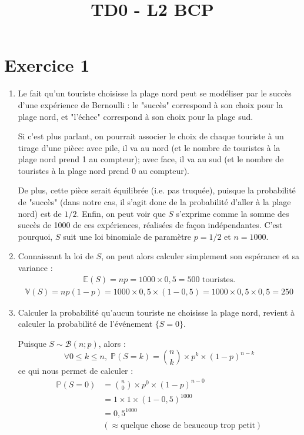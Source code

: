 \documentclass[a4paper,oneside,12pt]{article}
\title{TD0 - L2 BCP}
\author{}
\date{}
\theoremstyle{plain}
\def\V{\mathbb{V}}
\def\P{{\mathbb P}}
\def\E{{\mathbb E}}
\begin{document}
\maketitle

\section*{Exercice 1}



\begin{enumerate}
    \item Le fait qu'un touriste choisisse la plage nord peut se modéliser par le succès d'une expérience de Bernoulli : le "succès" correspond à son choix pour la plage nord, et "l'échec" correspond à son choix pour la plage sud.
    
    Si c'est plus parlant, on pourrait associer le choix de chaque touriste à un tirage d'une pièce: avec pile, il va au nord (et le nombre de touristes à la plage nord prend 1 au compteur); avec face, il va au sud (et le nombre de touristes à la plage nord prend 0 au compteur). 
    
    De plus, cette pièce serait équilibrée (i.e. pas truquée), puisque la probabilité de "succès" (dans notre cas, il s'agit donc de la probabilité d'aller à la plage nord) est de $1/2$. Enfin, on peut voir que $S$ s'exprime comme la somme des succès de 1000 de ces expériences, réalisées de façon indépendantes. C'est pourquoi, $S$ suit une loi binomiale de paramètre $p=1/2$ et $n=1000$.
    
    \item Connaissant la loi de $S$, on peut alors calculer simplement son espérance et sa variance :
    \begin{align*}
        \E(S) = np = 1000\times 0,5 = 500 \mbox{ touristes.}
    \end{align*}
    \begin{align*}
        \V(S) = np(1-p) = 1000\times 0,5\times (1-0,5) = 1000 \times 0,5 \times 0,5 = 250
    \end{align*}
    
     \item Calculer la probabilité qu'aucun touriste ne choisisse la plage nord,  revient à calculer la probabilité de l'événement $\{S = 0\}$. 
     
     Puisque $S \sim \mathcal{B}(n; p)$, alors :
     $$\forall 0\le k\le n,\; \P(S=k) = \binom{n}{k} \times p^k \times (1-p)^{n-k} $$
     ce qui nous permet de calculer :
     \begin{align*}
         \P(S = 0) &= \binom{n}{0}\times p^0\times (1-p)^{n-0} \\
         &= 1 \times 1 \times (1-0,5)^{1000}\\
         &=0,5^{1000}\\
         &(\approx \mbox{quelque chose de beaucoup trop petit})
     \end{align*}
    

\end{enumerate}
\end{document}

